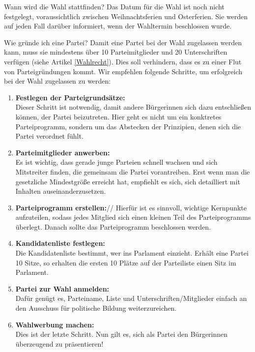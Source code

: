 \documentclass{sasbase}
\begin{document}
\begin{question}{Wann wird die Wahl stattfinden?}
	Das Datum f\"{u}r die Wahl ist noch nicht festgelegt, voraussichtlich zwischen Weihnachtsferien und Osterferien. Sie werden auf jeden Fall dar\"{u}ber informiert, wenn der Wahltermin beschlossen wurde.
\end{question}
\begin{question}{Wie gr\"{u}nde ich eine Partei?}
	Damit eine Partei bei der Wahl zugelassen werden kann, muss sie mindestens \"{u}ber 10 Parteimitglieder und 20 Unterschriften verf\"{u}gen (siehe Artikel \ref{Wahlrecht}). Dies soll verhindern, dass es zu einer Flut von Parteigr\"{u}ndungen kommt. Wir empfehlen folgende Schritte, um erfolgreich bei der Wahl zugelassen zu werden:
	\begin{enumerate}
		\item \textbf{Festlegen der Parteigrunds\"{a}tze:}\\ Dieser Schritt ist notwendig, damit andere B\"{u}rgerinnen sich dazu entschlie{\ss}en k\"{o}nnen, der Partei beizutreten. Hier geht es nicht um ein konktretes Parteiprogramm, sondern um das Abstecken der Prinzipien, denen sich die Partei verordnet f\"{u}hlt.
		\item \textbf{Parteimitglieder anwerben:}\\ Es ist wichtig, dass gerade junge Parteien schnell wachsen und sich Mitstreiter finden, die gemeinsam die Partei vorantreiben. Erst wenn man die gesetzliche Mindestgr\"{o}{\ss}e erreicht hat, empfiehlt es sich, sich detailliert mit Inhalten auseinanderzusetzen.
		\item \textbf{Parteiprogramm erstellen:}// Hierf\"{u}r ist es sinnvoll, wichtige Kernpunkte aufzuteilen, sodass jedes Mitglied sich einen kleinen Teil des Parteiprogramms \"{u}berlegt. Danach sollte das Parteiprogramm beschlossen werden.
		\item \textbf{Kandidatenliste festlegen:}\\ Die Kandidatenliste bestimmt, wer ins Parlament einzieht. Erh\"{a}lt eine Partei 10 Sitze, so erhalten die ersten 10 Pl\"{a}tze auf der Parteiliste einen Sitz im Parlament.
		\item \textbf{Partei zur Wahl anmelden:}\\ Daf\"{u}r gen\"{u}gt es, Parteiname, Liste und Unterschriften/Mitglieder einfach an den Ausschuss f\"{u}r politische Bildung weiterzureichen.
		\item \textbf{Wahlwerbung machen:}\\ Dies ist der letzte Schritt. Nun gilt es, sich als Partei den B\"{u}rgerinnen \"{u}berzeugend zu pr\"{a}sentieren!
	\end{enumerate}
\end{question}
\end{document}
